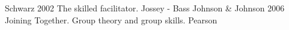 \begin{thebibliography}{1} %
	Schwarz 2002 The skilled facilitator. Jossey - Bass
	Johnson \& Johnson 2006 Joining Together. Group theory and group skills. Pearson

\end{thebibliography}